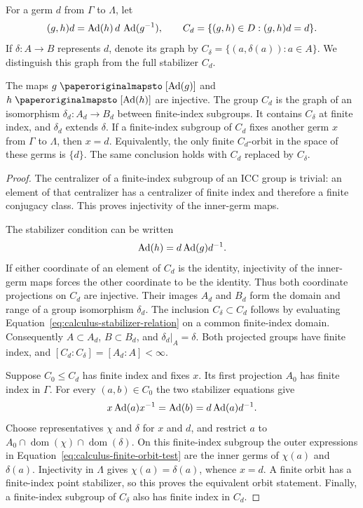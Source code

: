 For a germ $d$ from $\Gamma$ to $\Lambda$, let
\[
 (g,h)d=\operatorname{Ad}(h)\,d\,\operatorname{Ad}(g^{-1}),\qquad
 C_d=\{(g,h)\in D:(g,h)d=d\}.
\]
If $\delta:A\to B$ represents $d$, denote its graph by
$C_\delta=\{(a,\delta(a)):a\in A\}$.
We distinguish this graph from the full stabilizer $C_d$.

\begin{lemma}
\label{lem:calculus-germ-test}
The maps $g\mapsto[\Ad(g)]$ and $h\mapsto[\Ad(h)]$ are injective.
The group $C_d$ is the graph of an isomorphism
$\delta_d:A_d\to B_d$ between finite-index subgroups.  It contains
$C_\delta$ at finite index, and $\delta_d$ extends $\delta$.
If a finite-index subgroup of $C_d$ fixes another germ $x$ from
$\Gamma$ to $\Lambda$, then $x=d$.  Equivalently, the only finite
$C_d$-orbit in the space of these germs is $\{d\}$.
The same conclusion holds with $C_d$ replaced by $C_\delta$.
\end{lemma}

\begin{proof}
The centralizer of a finite-index subgroup of an ICC group is trivial:
an element of that centralizer has a centralizer of finite index and
therefore a finite conjugacy class.  This proves injectivity of the
inner-germ maps.

The stabilizer condition can be written
\begin{equation}\label{eq:calculus-stabilizer-relation}
 \operatorname{Ad}(h)=d\operatorname{Ad}(g)d^{-1}.
\end{equation}
If either coordinate of an element of $C_d$ is the identity, injectivity
of the inner-germ maps forces the other coordinate to be the identity.
Thus both coordinate projections on $C_d$ are injective.  Their images
$A_d$ and $B_d$ form the domain and range of a group isomorphism
$\delta_d$.  The inclusion $C_\delta\subset C_d$ follows by evaluating
Equation~\eqref{eq:calculus-stabilizer-relation} on a common finite-index
domain.  Consequently $A\subset A_d$, $B\subset B_d$, and
$\delta_d|_A=\delta$.  Both projected groups have finite index, and
$[C_d:C_\delta]=[A_d:A]<\infty$.

Suppose $C_0\leq C_d$ has finite index and fixes $x$.  Its first
projection $A_0$ has finite index in $\Gamma$.  For every
$(a,b)\in C_0$ the two stabilizer equations give
\begin{equation}\label{eq:calculus-finite-orbit-test}
 x\operatorname{Ad}(a)x^{-1}=\operatorname{Ad}(b)=d\operatorname{Ad}(a)d^{-1}.
\end{equation}
Choose representatives $\chi$ and $\delta$ for $x$ and $d$, and restrict
$a$ to $A_0\cap\operatorname{dom}(\chi)\cap
\operatorname{dom}(\delta)$.  On this finite-index subgroup the outer
expressions in Equation~\eqref{eq:calculus-finite-orbit-test} are the
inner germs of $\chi(a)$ and $\delta(a)$.  Injectivity in $\Lambda$
gives $\chi(a)=\delta(a)$, whence $x=d$.  A finite orbit has a
finite-index point stabilizer, so this proves the equivalent orbit
statement.  Finally, a finite-index subgroup of $C_\delta$ also has
finite index in $C_d$.
\end{proof}

